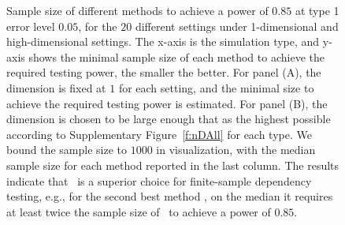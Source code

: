 \documentclass[11pt]{article}
\begin{document}
\begin{figure}[!ht]
\centering
{}
  \caption{Sample size of different methods to achieve a power of $0.85$ at type 1 error level $0.05$, for the $20$ different settings under 1-dimensional and high-dimensional settings. 
The x-axis is the simulation type, and y-axis shows the minimal sample size of each method to achieve the required testing power, the smaller the better. For panel (A), the dimension is fixed at $1$ for each setting, and the minimal size to achieve the required testing power is estimated. For panel (B), the dimension is chosen to be large enough that as the highest possible according to Supplementary Figure~\ref{f:nDAll} for each type. 
We bound the sample size to $1000$ in visualization, with the median sample size for each method reported in the last column. The results indicate that \Mgc~is a superior choice for finite-sample dependency testing, e.g., for the second best method \Hhg, on the median it requires at least twice the sample size of \Mgc~to achieve a power of $0.85$.
}
\label{f:Summary}
\end{figure}
\end{document}
